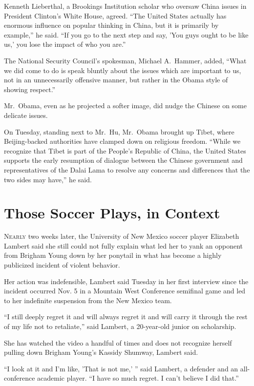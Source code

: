 ﻿\documentclass[12pt]{article}
\begin{document}
Kenneth Lieberthal, a Brookings Institution scholar who oversaw China issues in President Clinton's
White House, agreed. ``The United States actually has enormous influence on popular thinking in
China, but it is primarily by example,'' he said. ``If you go to the next step and say, 'You guys
ought to be like us,' you lose the impact of who you are.''

The National Security Council's spokesman, Michael A.~Hammer, added, ``What we did come to do is
speak bluntly about the issues which are important to us, not in an unnecessarily offensive manner,
but rather in the Obama style of showing respect.''

Mr.~Obama, even as he projected a softer image, did nudge the Chinese on some delicate issues.

On Tuesday, standing next to Mr.~Hu, Mr.~Obama brought up Tibet, where Beijing-backed authorities
have clamped down on religious freedom. ``While we recognize that Tibet is part of the People's
Republic of China, the United States supports the early resumption of dialogue between the Chinese
government and representatives of the Dalai Lama to resolve any concerns and differences that the
two sides may have,'' he said.

\section{Those Soccer Plays, in Context}

\lettrine{N}{early} two weeks later, the University of New Mexico soccer
player Elizabeth Lambert said she still could not fully explain what led her to yank an opponent
from Brigham Young down by her ponytail in what has become a highly publicized incident of violent
behavior.

Her action was indefensible, Lambert said Tuesday in her first interview since the incident occurred
Nov. 5 in a Mountain West Conference semifinal game and led to her indefinite suspension from the
New Mexico team.

``I still deeply regret it and will always regret it and will carry it through the rest of my life
not to retaliate\cite{retaliate},'' said Lambert, a 20-year-old junior on scholarship.

She has watched the video a handful of times and does not recognize herself pulling down Brigham
Young's Kassidy Shumway, Lambert said.

``I look at it and I'm like, 'That is not me,' '' said Lambert, a defender and an all-conference
academic player. ``I have so much regret. I can't believe I did that.''
\end{document}
